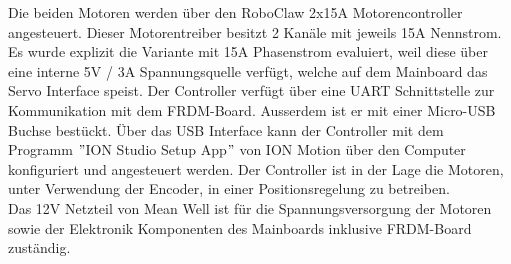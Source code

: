 Die beiden Motoren werden über den RoboClaw 2x15A Motorencontroller angesteuert. Dieser Motorentreiber besitzt 2 Kanäle mit jeweils 15A Nennstrom. Es wurde explizit die Variante mit 15A Phasenstrom evaluiert, weil diese über eine interne 5V / 3A Spannungsquelle verfügt, welche auf dem Mainboard das Servo Interface speist. Der Controller verfügt über eine UART Schnittstelle zur Kommunikation mit dem FRDM-Board. Ausserdem ist er mit einer Micro-USB Buchse bestückt. Über das USB Interface kann der Controller mit dem Programm $"$ION Studio Setup App$"$ von ION Motion über den Computer konfiguriert und angesteuert werden. Der Controller ist in der Lage die Motoren, unter Verwendung der Encoder, in einer Positionsregelung zu betreiben.\\
Das 12V Netzteil von Mean Well ist für die Spannungsversorgung der Motoren sowie der Elektronik Komponenten des Mainboards inklusive FRDM-Board zuständig.